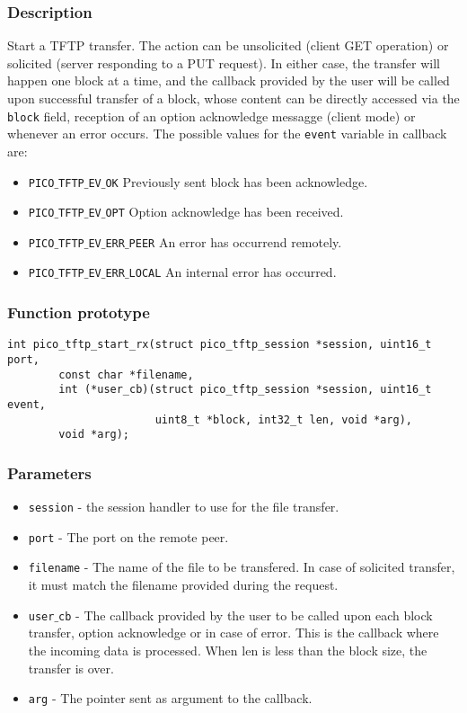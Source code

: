\subsubsection*{Description}
Start a TFTP transfer. The action can be unsolicited (client GET operation) or solicited (server responding to a PUT request).
In either case, the transfer will happen one block at a time, and the callback provided by the user will be called upon successful transfer of a block, whose content can be directly accessed via the \texttt{block} field, reception of an option acknowledge messagge (client mode) or whenever an error occurs.
The possible values for the \texttt{event} variable in callback are:
\begin{itemize}[noitemsep]
\item \texttt{PICO$\_$TFTP$\_$EV$\_$OK} Previously sent block has been acknowledge.
\item \texttt{PICO$\_$TFTP$\_$EV$\_$OPT} Option acknowledge has been received.
\item \texttt{PICO$\_$TFTP$\_$EV$\_$ERR$\_$PEER} An error has occurrend remotely.
\item \texttt{PICO$\_$TFTP$\_$EV$\_$ERR$\_$LOCAL} An internal error has occurred.
\end{itemize}

\subsubsection*{Function prototype}
\begin{verbatim}
int pico_tftp_start_rx(struct pico_tftp_session *session, uint16_t port,
        const char *filename,
        int (*user_cb)(struct pico_tftp_session *session, uint16_t event,
                       uint8_t *block, int32_t len, void *arg),
        void *arg);
\end{verbatim}

\subsubsection*{Parameters}
\begin{itemize}[noitemsep]
\item \texttt{session} - the session handler to use for the file transfer.
\item \texttt{port} - The port on the remote peer.
\item \texttt{filename} - The name of the file to be transfered. In case of solicited transfer, it must match the filename provided during the request.
\item \texttt{user$\_$cb} - The callback provided by the user to be called upon each block transfer, option acknowledge or in case of error. This is the callback where the incoming data is processed. When len is less than the block size, the transfer is over.
\item \texttt{arg} - The pointer sent as argument to the callback.
\end{itemize}

